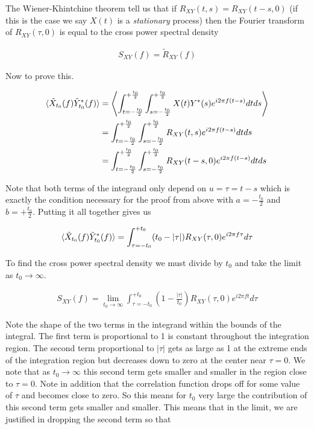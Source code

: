 \documentclass[12pt]{article}
\begin{document}
The Wiener-Khintchine theorem tell us that if $R_{XY}(t,s) = R_{XY}(t-s,0)$ (if this is the case we say $X(t)$ is a \textit{stationary} process) then the Fourier transform of $R_{XY}(\tau,0)$ is equal to the cross power spectral density

\begin{align}
S_{XY}(f) = \tilde{R}_{XY}(f)
\end{align}

Now to prove this.

\begin{align}
\braket{\tilde{X}_{t_0}(f)\tilde{Y}_{t_0}^*(f)} &= \left<\int_{t=-\frac{t_0}{2}}^{+\frac{t_0}{2}}\int_{s=-\frac{t_0}{2}}^{+\frac{t_0}{2}} X(t)Y^*(s) e^{i 2\pi f(t-s)} dt ds\right>\\
&= \int_{t=-\frac{t_0}{2}}^{+\frac{t_0}{2}}\int_{s=-\frac{t_0}{2}}^{+\frac{t_0}{2}} R_{XY}(t,s) e^{i 2\pi f (t-s)} dt ds\\
&= \int_{t=-\frac{t_0}{2}}^{+\frac{t_0}{2}}\int_{s=-\frac{t_0}{2}}^{+\frac{t_0}{2}} R_{XY}(t-s,0) e^{i 2\pi f (t-s)} dt ds
\end{align}

Note that both terms of the integrand only depend on $u=\tau=t-s$ which is exactly the condition necessary for the proof from above with $a=-\frac{t_0}{2}$ and $b=+\frac{t_0}{2}$. Putting it all together gives us

\begin{align}
\braket{\tilde{X}_{t_0}(f)\tilde{Y}_{t_0}^*(f)} = \int_{\tau=-t_0}^{+t_0}(t_0-|\tau|)R_{XY}(\tau,0) e^{i 2\pi f \tau} d\tau
\end{align}

To find the cross power spectral density we must divide by $t_0$ and take the limit as $t_0\rightarrow \infty$.

\begin{align}
S_{XY}(f) = \lim_{t_0\rightarrow \infty}\int_{\tau=-t_0}^{+t_0} \left(1-\frac{|\tau|}{t_0}\right) R_{XY}(\tau,0) e^{i 2\pi f t} d\tau
\end{align}

Note the shape of the two terms in the integrand within the bounds of the integral. The first term is proportional to 1 is constant throughout the integration region. The second term proportional to $|\tau|$ gets as large as 1 at the extreme ends of the integration region but decreases down to zero at the center near $\tau=0$. We note that as $t_0\rightarrow\infty$ this second term gets smaller and smaller in the region close to $\tau=0$. Note in addition that the correlation function drops off for some value of $\tau$ and becomes close to zero. So this means for $t_0$ very large the contribution of this second term gets smaller and smaller. This means that in the limit, we are justified in dropping the second term so that
\end{document}
